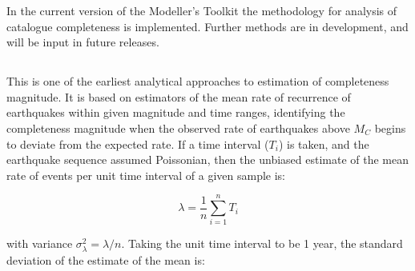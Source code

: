 In the current version of the Modeller's Toolkit the \textcite{Stepp1971} methodology for analysis of catalogue completeness is implemented. Further methods are in development, and will be input in future releases.

%
%

\subsection{\cite{Stepp1971}}

This is one of the earliest analytical approaches to estimation of completeness magnitude. It is based on estimators of the mean rate of recurrence of earthquakes within given magnitude and time ranges, identifying the completeness magnitude when the observed rate of earthquakes above $M_C$ begins to deviate from the expected rate. If a time interval ($T_i$) is taken, and the earthquake sequence assumed Poissonian, then the unbiased estimate of the mean rate of events per unit time interval of a given sample is:

\begin{equation}
   \lambda = \frac{1}{n} \sum_{i = 1}^{n} T_i
\end{equation}

with variance $\sigma_{\lambda}^{2} = \lambda / n$. Taking the unit time interval to be 1 year, the standard deviation of the estimate of the mean is:

